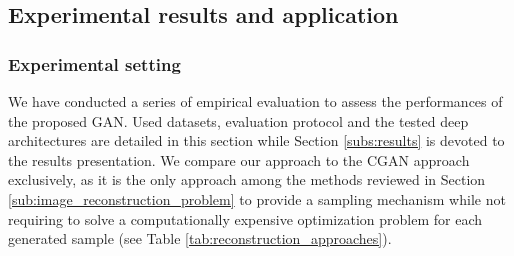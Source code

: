 \FloatBarrier

\subsection{Experimental results and application}
\label{sec:experiments}

\subsubsection{Experimental setting} \label{sec:experiments_protocol}
We have conducted a series of empirical evaluation to assess the performances of the proposed GAN. Used datasets, evaluation protocol and the tested deep architectures are detailed in this section while Section \ref{subs:results} is devoted to the results presentation. We compare our approach to the \ac{CGAN} approach exclusively, as it is the only approach among the methods reviewed in Section \ref{sub:image_reconstruction_problem} to provide a sampling  mechanism while not requiring to solve a computationally expensive optimization problem for each generated sample (see Table \ref{tab:reconstruction_approaches}). 
